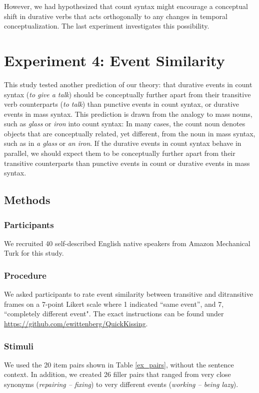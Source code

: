 \documentclass[review,12pt,authoryear]{elsarticle}
\newcommand*{\sectionformat}{\centering}
\begin{document}
However, we had hypothesized that count syntax might encourage a conceptual shift in durative verbs that acts orthogonally to any changes in temporal conceptualization. The last experiment investigates this possibility.

\section*{\sectionformat Experiment 4: Event Similarity}\label{sec_expES}
This study tested another prediction of our theory: that durative events in count syntax (\emph{to give a talk}) should be conceptually further apart from their transitive verb counterparts (\emph{to talk}) than punctive events in count syntax, or durative events in mass syntax. This prediction is drawn from the analogy to mass nouns, such as \emph{glass} or \emph{iron} into count syntax: In many cases, the count noun denotes objects that are conceptually related, yet different, from the noun in mass syntax, such as in \emph{a glass} or \emph{an iron}. If the durative events in count syntax behave in parallel, we should expect them to be conceptually further apart from their transitive counterparts than punctive events in count or durative events in mass syntax.

\subsection*{\sectionformat Methods}\label{sec_methodES}
\subsubsection*{Participants}
We recruited 40 self-described English native speakers from Amazon Mechanical Turk for this study.

\subsubsection*{Procedure}\label{sec_procES}
We asked participants to rate event similarity between transitive and ditransitive frames on a 7-point Likert scale where 1 indicated ``same event”, and  7, ``completely different event". The exact instructions can be found under \url{https://github.com/ewittenberg/QuickKissing}.

\subsubsection*{Stimuli}\label{sec_stimES}
We used the 20 item pairs shown in Table \ref{ex_pairs}, without the sentence context. In addition, we created 26 filler pairs that ranged from very close synonyms (\emph{repairing -- fixing}) to very different events (\emph{working -- being lazy}).
\end{document}
